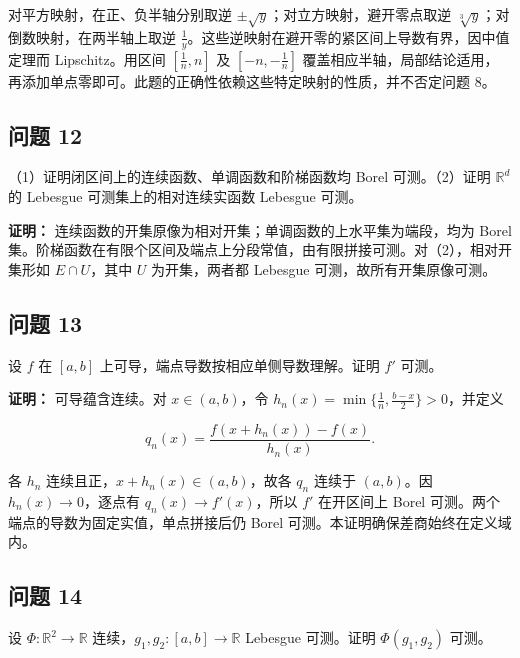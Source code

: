 \documentclass[11pt,a4paper]{article}
\begin{document}
对平方映射，在正、负半轴分别取逆
\(\pm\sqrt y\)；对立方映射，避开零点取逆
\(\sqrt[3]y\)；对倒数映射，在两半轴上取逆
\(\frac1y\)。这些逆映射在避开零的紧区间上导数有界，因中值定理而
Lipschitz。用区间 \([\frac1n,n]\) 及 \([-n,-\frac1n]\)
覆盖相应半轴，局部结论适用，再添加单点零即可。此题的正确性依赖这些特定映射的性质，并不否定问题
8。

\subsection{问题 12}\label{ux95eeux9898-12}

（1）证明闭区间上的连续函数、单调函数和阶梯函数均 Borel 可测。（2）证明
\(\mathbb R^d\) 的 Lebesgue 可测集上的相对连续实函数 Lebesgue 可测。

\textbf{证明：}
连续函数的开集原像为相对开集；单调函数的上水平集为端段，均为 Borel
集。阶梯函数在有限个区间及端点上分段常值，由有限拼接可测。对（2），相对开集形如
\(E\cap U\)，其中 \(U\) 为开集，两者都 Lebesgue
可测，故所有开集原像可测。

\subsection{问题 13}\label{ux95eeux9898-13}

设 \(f\) 在 \([a,b]\) 上可导，端点导数按相应单侧导数理解。证明 \(f'\)
可测。

\textbf{证明：} 可导蕴含连续。对 \(x\in(a,b)\)，令
\(h_n(x)=\min\{\frac1n,\frac{b-x}{2}\}>0\)，并定义

\begin{equation*}
q_n(x)=\frac{f(x+h_n(x))-f(x)}{h_n(x)}.
\tag{3.1.13}
\end{equation*}

各 \(h_n\) 连续且正，\(x+h_n(x)\in(a,b)\)，故各 \(q_n\) 连续于
\((a,b)\)。因 \(h_n(x)\to0\)，逐点有 \(q_n(x)\to f'(x)\)，所以 \(f'\)
在开区间上 Borel 可测。两个端点的导数为固定实值，单点拼接后仍 Borel
可测。本证明确保差商始终在定义域内。

\subsection{问题 14}\label{ux95eeux9898-14}

设 \(\Phi:\mathbb R^2\to\mathbb R\) 连续，\(g_1,g_2:[a,b]\to\mathbb R\)
Lebesgue 可测。证明 \(\Phi(g_1,g_2)\) 可测。
\end{document}
